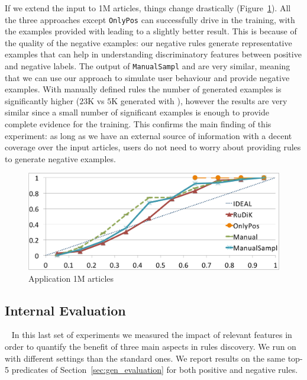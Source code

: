 If we extend the input to 1M articles, things change drastically (Figure~\ref{fig:deep_dive_1M}). All the three approaches except \texttt{OnlyPos} can successfully drive \deepdive in the training, with the examples provided with \krd leading to a slightly better result. This is because of the quality of the negative examples: our negative rules generate representative examples that can help \deepdive in understanding discriminatory features between positive and negative labels.
The output of \texttt{ManualSampl} and \krd are very similar, meaning that we can use our approach to simulate user behaviour and provide negative examples. With manually defined rules the number of generated examples is significantly higher ($23$K vs $5$K generated with \krd), however the results are very similar since a small number of significant examples is enough to provide complete evidence for the training. 
This confirms the main finding of this experiment: as long as we have an external source of information with a decent coverage over the input articles, users do not need to worry about providing rules to generate negative examples.

\begin{figure}[t]
	\centering
	\includegraphics[width=.7\columnwidth]{include/figure/deepDive1M.pdf}
	\caption{\deepdive Application 1M articles}
	\label{fig:deep_dive_1M}
\end{figure}

\subsection{Internal Evaluation} ~\label{sec:krd_int_evaluation}
In this last set of experiments we measured the impact of \krd relevant features in order to quantify the benefit of three main aspects in rules discovery. 
We run \krd on \dbpedia with different settings than the standard ones.
We report results on the same top-5 predicates of Section~\ref{sec:gen_evaluation} for both positive and negative rules.

